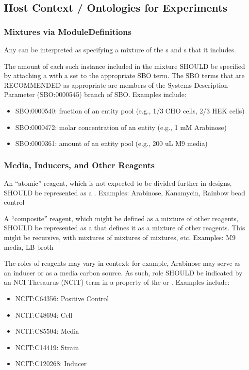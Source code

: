 \subsection{Host Context / Ontologies for Experiments}

\subsubsection{Mixtures via ModuleDefinitions}

Any  can be interpreted as specifying a mixture of the s and s that it includes.

The amount of each such instance included in the mixture SHOULD be specified by attaching a  with a  set to the appropriate SBO term. The SBO terms that are RECOMMENDED as appropriate are members of the Systems Description Parameter (SBO:0000545) branch of SBO. Examples include:
\begin{itemize}
\item SBO:0000540: fraction of an entity pool (e.g., 1/3 CHO cells, 2/3 HEK cells)
\item SBO:0000472: molar concentration of an entity (e.g., 1 mM Arabinose)
\item SBO:0000361: amount of an entity pool (e.g., 200 uL M9 media)
\end{itemize}

\subsubsection{Media, Inducers, and Other Reagents}

An ``atomic'' reagent, which is not expected to be divided further in designs, SHOULD be represented as a \linebreak {}. Examples: Arabinose, Kanamycin, Rainbow bead control

A ``composite'' reagent, which might be defined as a mixture of other reagents, SHOULD be represented as a  that defines it as a mixture of other reagents. This might be recursive, with mixtures of mixtures of mixtures, etc. Examples: M9 media, LB broth

The roles of reagents may vary in context: for example, Arabinose may serve as an inducer or as a media carbon source. As such, role SHOULD be indicated by an NCI Thesaurus (NCIT) term in a  property of the  or . Examples include:
\begin{itemize}
\item NCIT:C64356: Positive Control
\item NCIT:C48694: Cell
\item NCIT:C85504: Media
\item NCIT:C14419: Strain
\item NCIT:C120268: Inducer
\end{itemize}

